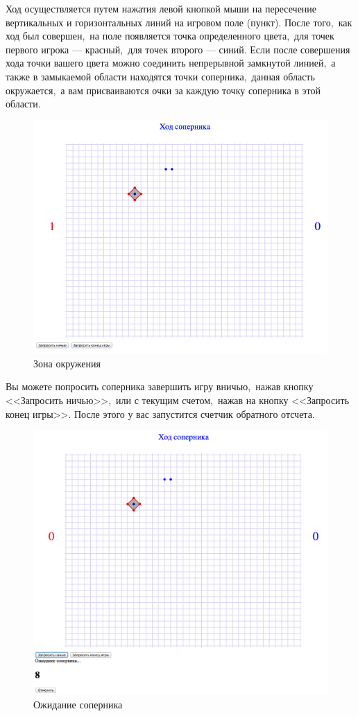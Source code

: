 \documentclass[14pt,a4paper]{report}
\begin{document}
Ход осуществляется путем нажатия левой кнопкой мыши на пересечение вертикальных и горизонтальных линий на игровом поле (пункт). После того,~как ход был совершен,~на поле появляется точка определенного цвета,~для точек первого игрока --- красный,~для точек второго --- синий. Если после совершения хода точки вашего цвета можно соединить непрерывной замкнутой линией,~а также в замыкаемой области находятся точки соперника,~данная область окружается,~а вам присваиваются очки за каждую точку соперника в этой области.
\begin{figure}[H]
\centerline{\includegraphics[scale=0.5]{gfx/15_game_zone.png}}
\caption{Зона окружения}
\label{fig:game_zone}
\end{figure}
Вы можете попросить соперника завершить игру вничью,~нажав кнопку <<Запросить ничью>>,~или с текущим счетом,~нажав на кнопку <<Запросить конец игры>>. После этого у вас запустится счетчик обратного отсчета.
\begin{figure}[H]
\centerline{\includegraphics[scale=0.5]{gfx/16_game_request.png}}
\caption{Ожидание соперника}
\label{fig:game_request}
\end{figure}
\end{document}
